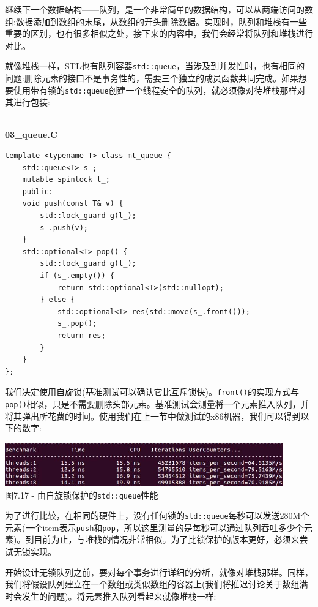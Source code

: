 
继续下一个数据结构——队列，是一个非常简单的数据结构，可以从两端访问的数组:数据添加到数组的末尾，从数组的开头删除数据。实现时，队列和堆栈有一些重要的区别，也有很多相似之处，接下来的内容中，我们会经常将队列和堆栈进行对比。

就像堆栈一样，STL也有队列容器\texttt{std::queue}，当涉及到并发性时，也有相同的问题:删除元素的接口不是事务性的，需要三个独立的成员函数共同完成。如果想要使用带有锁的\texttt{std::queue}创建一个线程安全的队列，就必须像对待堆栈那样对其进行包装:

\hspace*{\fill} \\ %
\noindent
\textbf{03\_queue.C}
\begin{lstlisting}[style=styleCXX]
template <typename T> class mt_queue {
	std::queue<T> s_;
	mutable spinlock l_;
	public:
	void push(const T& v) {
		std::lock_guard g(l_);
		s_.push(v);
	}
	std::optional<T> pop() {
		std::lock_guard g(l_);
		if (s_.empty()) {
			return std::optional<T>(std::nullopt);
		} else {
			std::optional<T> res(std::move(s_.front()));
			s_.pop();
			return res;
		}
	}
};
\end{lstlisting}

我们决定使用自旋锁(基准测试可以确认它比互斥锁快)。\texttt{front()}的实现方式与\texttt{pop()}相似，只是不需要删除头部元素。基准测试会测量将一个元素推入队列，并将其弹出所花费的时间。使用我们在上一节中做测试的x86机器，我们可以得到以下的数字:

\begin{center}
\includegraphics[width=0.9\textwidth]{content/2/chapter7/images/17.jpg}\\
图7.17 - 由自旋锁保护的\texttt{std::queue}性能
\end{center}

为了进行比较，在相同的硬件上，没有任何锁的\texttt{std::queue}每秒可以发送280M个元素(一个item表示\texttt{push}和\texttt{pop}，所以这里测量的是每秒可以通过队列吞吐多少个元素)。到目前为止，与堆栈的情况非常相似。为了比锁保护的版本更好，必须来尝试无锁实现。


开始设计无锁队列之前，要对每个事务进行详细的分析，就像对堆栈那样。同样，我们将假设队列建立在一个数组或类似数组的容器上(我们将推迟讨论关于数组满时会发生的问题)。将元素推入队列看起来就像堆栈一样:

